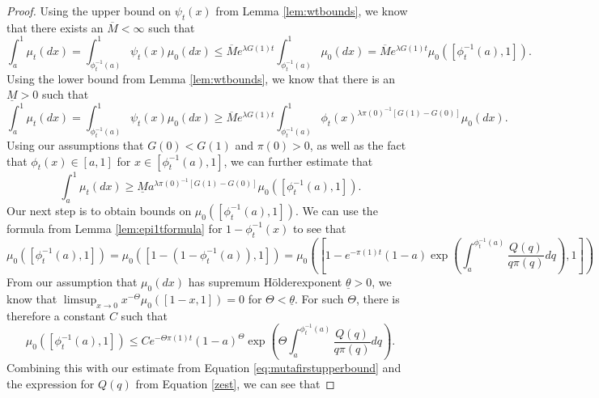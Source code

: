 \documentclass[11pt]{article}
\numberwithin{equation}{section}
\newcommand{\holder}{H{\"o}lder\:}
\begin{document}
{\begin{proof}
Using the upper bound on $\psi_t(x)$ from Lemma \ref{lem:wtbounds}, we know that there exists an $\overline{M} < \infty$ such that
\begin{equation} \label{eq:mutafirstupperbound}
    \int_{a}^1 \mu_t(dx) = \int_{\phi_t^{-1}(a)}^1 \psi_t(x) \mu_0(dx) \leq \overline{M} e^{\lambda G(1) t} \int_{\phi_t^{-1}(a)}^1  \mu_0(dx) = \overline{M} e^{\lambda G(1) t} \mu_0\left(\left[\phi_t^{-1}(a) ,1 \right] \right).
\end{equation}
Using the lower bound from Lemma \ref{lem:wtbounds}, we know that there is an $\underline{M} > 0$ such that 
\begin{equation}
        \int_{a}^1 \mu_t(dx) = \int_{\phi_t^{-1}(a)}^1 \psi_t(x) \mu_0(dx) \geq \overline{M} e^{\lambda G(1) t} \int_{\phi_t^{-1}(a)}^1  \phi_t(x)^{\lambda \pi(0)^{-1} \left[G(1) - G(0) \right]}\mu_0(dx).
\end{equation}
Using our assumptions that $G(0) < G(1)$ and $\pi(0) > 0$, as well as the fact that $\phi_t(x) \in [a,1]$ for $x \in [\phi_t^{-1}(a),1]$, we can further estimate that 
\begin{equation}  \label{eq:mutafirstlowerbound}
    \int_{a}^1 \mu_t(dx) \geq \underline{M} a^{\lambda \pi(0)^{-1} \left[G(1) - G(0)\right]} \mu_0\left( \left[\phi_t^{-1}(a),1\right] \right).
\end{equation}
 Our next step is to obtain bounds on $\mu_0\left( \left[\phi_t^{-1}(a),1 \right]\right)$. We can use the formula from Lemma \ref{lem:epi1tformula} for $1 - \phi_t^{-1}(x)$ to see that
%
\begin{dmath} \label{eq:mu0identity}
\mu_0\left(\left[ \phi_t^{-1}(a), 1 \right] \right) = \mu_0\left(\left[ 1 - \left(1 - \phi_t^{-1}(a)\right), 1 \right] \right) = \mu_0\left(\left[ 1 - e^{- \pi(1) t} \left( 1 - a \right) \exp\left(\int_{a}^{\phi_t^{-1}(a)} \frac{Q(q)}{q \pi(q)} dq \right), 1 \right] \right)
\end{dmath}
%
From our assumption that $\mu_0(dx)$ has supremum \holder exponent $\underline{\theta} > 0$, we know that $\limsup_{x \to 0} x^{-\Theta} \mu_0([1-x,1]) = 0$ for $\Theta < \underline{\theta}$. For such $\Theta$, there is therefore a constant $C$ such that
\begin{dmath}
    \mu_0\left(\left[\phi_t^{-1}(a),1\right] \right) \leq C e^{-\Theta \pi(1) t} \left( 1 - a\right)^{\Theta} \exp\left(\Theta \int_{a}^{\phi_t^{-1}(a)} \frac{Q(q)}{q \pi(q)} dq\right). 
\end{dmath}
Combining this with our estimate from Equation \eqref{eq:mutafirstupperbound} and the expression for $Q(q)$ from Equation \eqref{zest}, we can see that

\end{proof}}
\end{document}
